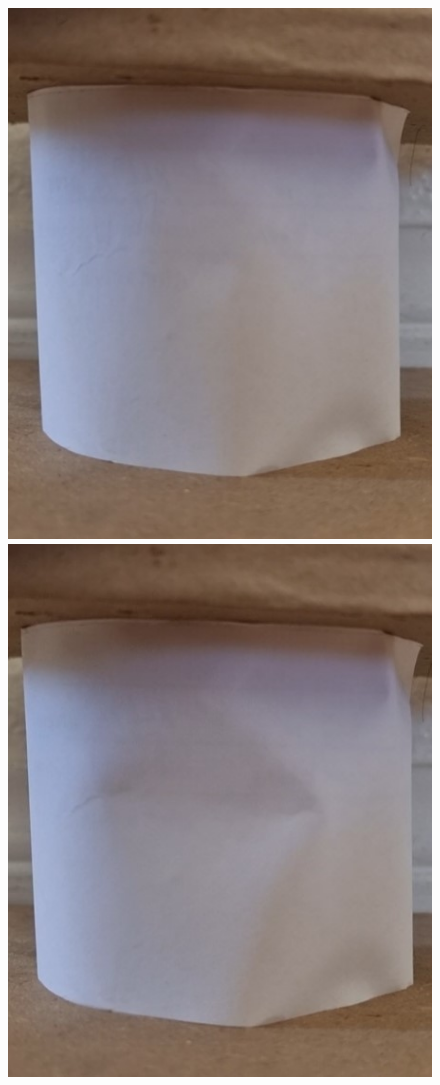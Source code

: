 \begin{figure}[!b]
  \includegraphics[scale=0.40]{figures/Buckling_1.jpg}\quad
  \includegraphics[scale=0.41]{figures/Buckling_2.jpg}\quad

\end{figure}
